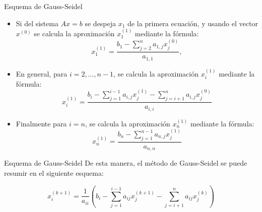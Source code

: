 \documentclass[10pt]{beamer}
\begin{document}
  \begin{frame}{Esquema de Gauss-Seidel}
  \begin{itemize}
    \item Si del sistema $Ax=b$ se despeja $x_1$ de la primera ecuaci\'on, y usando el vector $x^{(0)}$ se calcula la aproximaci\'on $x_1^{(1)}$ mediante la f\'ormula:
    {\small
    $$
    x_1^{(1)} = \displaystyle\frac{b_1-\displaystyle\sum_{j=2}^na_{1,j}x_j^{(0)}}{a_{1,1}}, 
    $$}
    \item<2-> En general, para $i=2,\ldots,n-1$, se calcula la aproximaci\'on $x_i^{(1)}$ mediante la f\'ormula:
    {\small
    $$
    x_i^{(1)} = \displaystyle\frac{b_i- \displaystyle \sum_{j=1}^{i-1}a_{i,j}x_j^{(1)} - \displaystyle \sum_{j=i+1}^na_{i,j}x_j^{(0)}}{a_{i,i}}
    $$}
    \item<3-> Finalmente para $i=n$, se calcula la aproximaci\'on $x_n^{(1)}$ mediante la f\'ormula:
    {\small
    $$
    x_n^{(1)} = \displaystyle\frac{b_n- \displaystyle \sum_{j=1}^{n-1}a_{n,j}x_j^{(1)}}{a_{n,n}}
    $$}
  \end{itemize}
  \end{frame}
  \begin{frame}{Esquema de Gauss-Seidel}
    De esta manera, el m\'etodo de Gauss-Seidel se puede resumir en el siguiente esquema:
  \begin{block}{}
  $$
  x_i^{(k+1)} = \dfrac{1}{a_{ii}}\left(b_i-\sum_{j=1}^{i-1}a_{ij}x_j^{(k+1)}-\sum_{j=i+1}^{n}a_{ij}x_j^{(k)}\right)
  $$
 \end{block}
  \end{frame}
\end{document}
